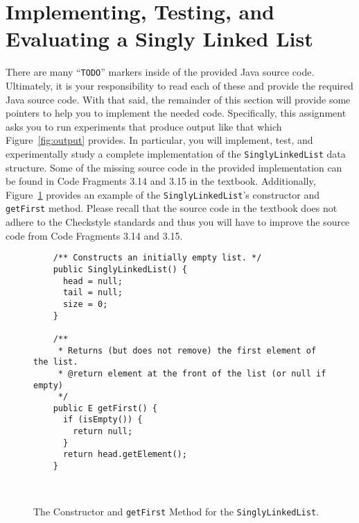 \documentclass[11pt]{article}
\newcommand{\command}[1]{``\lstinline{#1}''}
\newcommand{\program}[1]{\lstinline{#1}}
\begin{document}
\section*{Implementing, Testing, and Evaluating a Singly Linked List}

There are many \command{TODO} markers inside of the provided Java source code.
Ultimately, it is your responsibility to read each of these and provide the
required Java source code. With that said, the remainder of this section will
provide some pointers to help you to implement the needed code. Specifically,
this assignment asks you to run experiments that produce output like that which
Figure~\ref{fig:output} provides. In particular, you will implement, test, and
experimentally study a complete implementation of the \program{SinglyLinkedList}
data structure. Some of the missing source code in the provided implementation
can be found in Code Fragments 3.14 and 3.15 in the textbook. Additionally,
Figure~\ref{fig:constructor} provides an example of the
\program{SinglyLinkedList}'s constructor and \program{getFirst} method. Please
recall that the source code in the textbook does not adhere to the Checkstyle
standards and thus you will have to improve the source code from Code Fragments
3.14 and 3.15.

  \begin{figure}[t]
    \centering
    \begin{verbatim}
    /** Constructs an initially empty list. */
    public SinglyLinkedList() {
      head = null;
      tail = null;
      size = 0;
    }

    /**
     * Returns (but does not remove) the first element of the list.
     * @return element at the front of the list (or null if empty)
     */
    public E getFirst() {
      if (isEmpty()) {
        return null;
      }
      return head.getElement();
    }
    \end{verbatim}
  \vspace*{-.5in}
  \caption{The Constructor and \program{getFirst} Method for the \program{SinglyLinkedList}.}~\label{fig:constructor}
  \vspace*{-.25in}
\end{figure}
\end{document}
